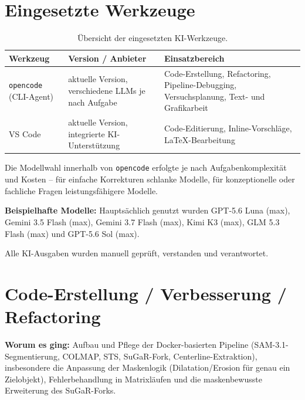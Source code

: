 \documentclass[12pt,a4paper]{article}
\begin{document}
\section{Eingesetzte Werkzeuge}

\begin{table}[H]
\centering
\small
\begin{tabularx}{\textwidth}{p{3.8cm}p{4.2cm}X}
\toprule
Werkzeug & Version / Anbieter & Einsatzbereich\\
\midrule
\texttt{opencode} (CLI-Agent) & aktuelle Version, verschiedene LLMs je nach Aufgabe & Code-Erstellung, Refactoring, Pipeline-Debugging, Versuchsplanung, Text- und Grafikarbeit\\
VS Code & aktuelle Version, integrierte KI-Unterstützung & Code-Editierung, Inline-Vorschläge, LaTeX-Bearbeitung\\
\bottomrule
\end{tabularx}
\caption{Übersicht der eingesetzten KI-Werkzeuge.}
\end{table}

Die Modellwahl innerhalb von \texttt{opencode} erfolgte je nach Aufgabenkomplexität und Kosten -- für einfache Korrekturen schlanke Modelle, für konzeptionelle oder fachliche Fragen leistungsfähigere Modelle.

\textbf{Beispielhafte Modelle:} Hauptsächlich genutzt wurden GPT-5.6 Luna (max), Gemini 3.5 Flash (max), Gemini 3.7 Flash (max), Kimi K3 (max), GLM 5.3 Flash (max) und GPT-5.6 Sol (max).

Alle KI-Ausgaben wurden manuell geprüft, verstanden und verantwortet.

\section{Code-Erstellung / Verbesserung / Refactoring}

\textbf{Worum es ging:} Aufbau und Pflege der Docker-basierten Pipeline (SAM-3.1-Segmentierung, COLMAP, STS, SuGaR-Fork, Centerline-Extraktion), insbesondere die Anpassung der Maskenlogik (Dilatation/Erosion für genau ein Zielobjekt), Fehlerbehandlung in Matrixläufen und die maskenbewusste Erweiterung des SuGaR-Forks.
\end{document}
